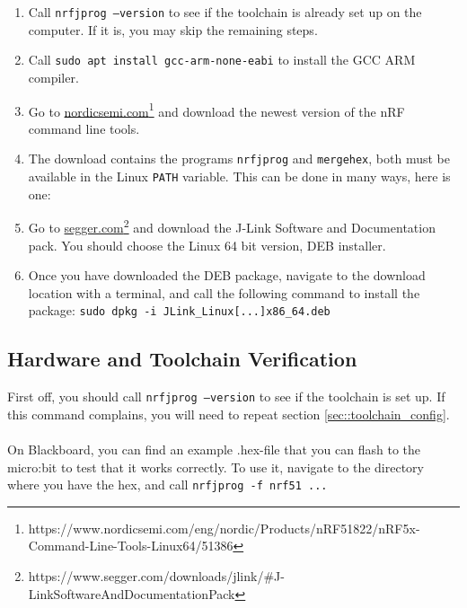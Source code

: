 \documentclass[11pt,a4paper]{article}
\begin{document}
\begin{enumerate}
\item Call \texttt{nrfjprog --version} to see if the toolchain is already set up on the computer. If it is, you may skip the remaining steps.
\item Call \texttt{sudo apt install gcc-arm-none-eabi} to install the GCC ARM compiler.
\item Go to \href{https://www.nordicsemi.com/eng/nordic/Products/nRF51822/nRF5x-Command-Line-Tools-Linux64/51386}{nordicsemi.com}\footnote{https://www.nordicsemi.com/eng/nordic/Products/nRF51822/nRF5x-Command-Line-Tools-Linux64/51386} and download the newest version of the nRF command line tools.
\item The download contains the programs \texttt{nrfjprog} and \texttt{mergehex}, both must be available in the Linux \texttt{PATH} variable. This can be done in many ways, here is one:
\item Go to \href{https://www.segger.com/downloads/jlink/\#J-LinkSoftwareAndDocumentationPack}{segger.com}\footnote{https://www.segger.com/downloads/jlink/\#J-LinkSoftwareAndDocumentationPack} and download the J-Link Software and Documentation pack. You should choose the Linux 64 bit version, DEB installer.
\item Once you have downloaded the DEB package, navigate to the download location with a terminal, and call the following command to install the package: \texttt{sudo dpkg -i JLink_Linux[...]x86_64.deb}
\end{enumerate}

\subsection{Hardware and Toolchain Verification}
First off, you should call \texttt{nrfjprog --version} to see if the toolchain is set up. If this command complains, you will need to repeat section \ref{sec::toolchain_config}.\\
\\
On Blackboard, you can find an example .hex-file that you can flash to the micro:bit to test that it works correctly. To use it, navigate to the directory where you have the hex, and call \texttt{nrfjprog -f nrf51 ...} 
\end{document}
